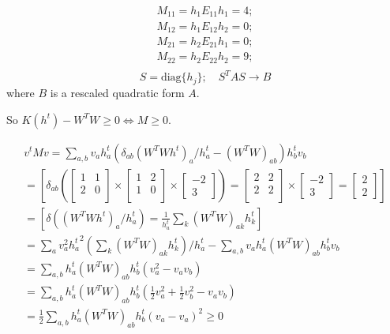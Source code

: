 \documentclass{extreport}
\begin{document}
\begin{align*}
  M_{11} = h_1 E_{11} h_1 = 4; \\
  M_{12} = h_1 E_{12} h_2 = 0; \\
  M_{21} = h_2 E_{21} h_1 = 0; \\
  M_{22} = h_2 E_{22} h_2 = 9; \\
\end{align*}
$$ S = \text{diag}\{h_j\}; \quad S^T A S \rightarrow B$$
where $B$ is a rescaled quadratic form $A$.

So $K(h^t) - W^TW \geqslant 0 \iff M \geqslant 0$.

\begin{multline*}
  v^t M v =
  \sum_{a,b}v_a h_a^t (\delta_{ab}(W^TWh^t)_a / h_a^t
  -(W^TW)_{ab})h_b^t v_b \\
  =
  \left[
    \delta_{ab}
    \left(
      \begin{bmatrix}1 & 1 \\ 2 & 0 \\ \end{bmatrix} \times
      \begin{bmatrix}1 & 2 \\ 1 & 0 \\ \end{bmatrix} \times
      \begin{bmatrix} -2 \\ 3 \end{bmatrix}
    \right) =
      \begin{bmatrix}2 & 2 \\ 2 & 2 \\ \end{bmatrix} \times
      \begin{bmatrix} -2 \\ 3 \end{bmatrix} =
      \begin{bmatrix} 2 \\ 2 \end{bmatrix}
  \right] \\
  =
  \left[
    \delta((W^TWh^t)_a / h_a^t) =
    \frac{1}{h_a^t} \sum_k (W^TW)_{ak} h_k^t
  \right] \\
  =
  \sum_a v_a^2 {h_a^t}^2 (\sum_k(W^TW)_{ak}h_k^t)/h_a^t -
    \sum_{a,b} v_ah_a^t(W^TW)_{ab}h_b^tv_b \\
  = \sum_{a,b}h_a^t(W^TW)_{ab}h_b^t(v_a^2 - v_av_b) \\
  = \sum_{a,b}h_a^t(W^TW)_{ab}h_b^t(
    \frac{1}{2}v_a^2 + \frac{1}{2}v_b^2 - v_av_b) \\
  = \frac{1}{2} \sum_{a,b}h_a^t(W^TW)_{ab}h_b^t(v_a - v_a)^2 \geqslant 0 \\
\end{multline*}
\end{document}

